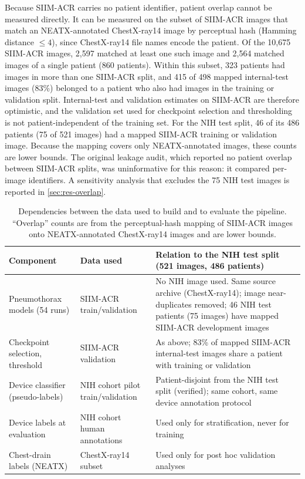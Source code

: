 \documentclass{ieeeaccess}
\begin{document}
Because SIIM-ACR carries no patient identifier, patient overlap cannot be measured directly. It can be measured on the subset of SIIM-ACR images that match an NEATX-annotated ChestX-ray14 image \cite{jimenez2023shortcuts} by perceptual hash (Hamming distance $\le 4$), since ChestX-ray14 file names encode the patient. Of the 10{,}675 SIIM-ACR images, 2{,}597 matched at least one such image and 2{,}564 matched images of a single patient (860 patients). Within this subset, 323 patients had images in more than one SIIM-ACR split, and 415 of 498 mapped internal-test images (83\%) belonged to a patient who also had images in the training or validation split. Internal-test and validation estimates on SIIM-ACR are therefore optimistic, and the validation set used for checkpoint selection and thresholding is not patient-independent of the training set. For the NIH test split, 46 of its 486 patients (75 of 521 images) had a mapped SIIM-ACR training or validation image. Because the mapping covers only NEATX-annotated images, these counts are lower bounds. The original leakage audit, which reported no patient overlap between SIIM-ACR splits, was uninformative for this reason: it compared per-image identifiers. A sensitivity analysis that excludes the 75 NIH test images is reported in \cref{sec:res-overlap}.

\begin{table}[!t]
\centering\small
\caption{Dependencies between the data used to build and to evaluate the pipeline. ``Overlap'' counts are from the perceptual-hash mapping of SIIM-ACR images onto NEATX-annotated ChestX-ray14 images and are lower bounds.}
\label{tab:depend}
\begin{tabularx}{\linewidth}{@{}p{3.2cm} p{3.6cm} X@{}}
\toprule
Component & Data used & Relation to the NIH test split (521 images, 486 patients) \\
\midrule
Pneumothorax models (54 runs) & SIIM-ACR train/validation & No NIH image used. Same source archive (ChestX-ray14); image near-duplicates removed; 46 NIH test patients (75 images) have mapped SIIM-ACR development images \\
Checkpoint selection, threshold & SIIM-ACR validation & As above; 83\% of mapped SIIM-ACR internal-test images share a patient with training or validation \\
Device classifier (pseudo-labels) & NIH cohort pilot train/validation & Patient-disjoint from the NIH test split (verified); same cohort, same device annotation protocol \\
Device labels at evaluation & NIH cohort human annotations & Used only for stratification, never for training \\
Chest-drain labels (NEATX) & ChestX-ray14 subset & Used only for post hoc validation analyses \\
\bottomrule
\end{tabularx}
\end{table}
\end{document}
